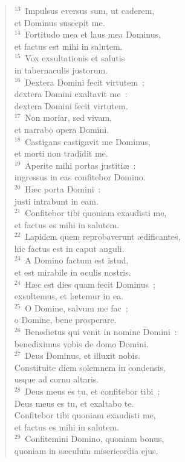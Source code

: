 \begin{verse}
${}^{13}$~Impulsus eversus sum, ut caderem,\\ et Dominus suscepit me.\\
${}^{14}$~Fortitudo mea et laus mea Dominus,\\ et factus est mihi in salutem.\\
${}^{15}$~Vox exsultationis et salutis\\ in tabernaculis justorum.\\
${}^{16}$~Dextera Domini fecit virtutem~;\\ dextera Domini exaltavit me~:\\ dextera Domini fecit virtutem.\\
${}^{17}$~Non moriar, sed vivam,\\ et narrabo opera Domini.\\
${}^{18}$~Castigans castigavit me Dominus,\\ et morti non tradidit me.\\
${}^{19}$~Aperite mihi portas justiti\ae~:\\ ingressus in eas confitebor Domino.\\
${}^{20}$~H\ae c porta Domini~:\\ justi intrabunt in eam.\\
${}^{21}$~Confitebor tibi quoniam exaudisti me,\\ et factus es mihi in salutem.\\
${}^{22}$~Lapidem quem reprobaverunt \ae dificantes,\\ hic factus est in caput anguli.\\
${}^{23}$~A Domino factum est istud,\\ et est mirabile in oculis nostris.\\
${}^{24}$~H\ae c est dies quam fecit Dominus~;\\ exsultemus, et l\ae temur in ea.\\
${}^{25}$~O Domine, salvum me fac~;\\ o Domine, bene prosperare.\\
${}^{26}$~Benedictus qui venit in nomine Domini~:\\ benediximus vobis de domo Domini.\\
${}^{27}$~Deus Dominus, et illuxit nobis.\\ Constituite diem solemnem in condensis,\\ usque ad cornu altaris.\\
${}^{28}$~Deus meus es tu, et confitebor tibi~;\\ Deus meus es tu, et exaltabo te.\\ Confitebor tibi quoniam exaudisti me,\\ et factus es mihi in salutem.\\
${}^{29}$~Confitemini Domino, quoniam bonus,\\ quoniam in s\ae culum misericordia ejus.\end{verse}



